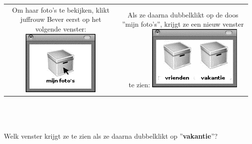 \documentclass[12pt]{article}
\begin{document}
\begin{minipage}{\textwidth}
			\begin{tabulary}{\linewidth}{C C}
				Om haar foto's te bekijken, klikt juffrouw Bever eerst op het volgende venster:
				\includegraphics[width=\linewidth]{image1} &
				Als ze daarna dubbelklikt op de doos ''mijn foto's'', krijgt ze een nieuw venster te zien:
				\includegraphics[width=\linewidth]{image2} \\
			\end{tabulary} \\ \\ \\
			Welk venster krijgt ze te zien als ze daarna dubbelklikt op ''\textbf{vakantie}''?
	

\end{minipage}
\end{document}

